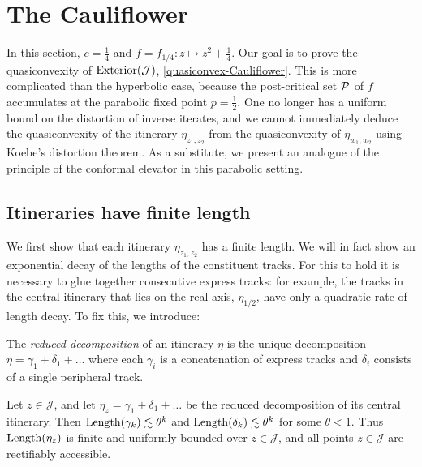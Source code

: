  

\section{The Cauliflower}
In this section, $c=\frac 14$ and $f=f_{1/4}: z\mapsto z^2+ \frac 14$.
Our goal is to prove the quasiconvexity of $\operatorname{Exterior}(\mathcal{J})$, \cref{quasiconvex-Cauliflower}. 
This is more complicated than the hyperbolic case, 
because the post-critical set $\operatorname{\mathcal P}$ of $f$ accumulates at the parabolic fixed point $p=\frac 12$. 
One no longer has a uniform bound on the distortion of inverse iterates, 
and we cannot immediately deduce the quasiconvexity of the itinerary $\eta_{z_1,z_2}$ from the quasiconvexity of $\eta_{w_1,w_2}$ using Koebe's distortion theorem. 
As a substitute, we present an analogue of the principle of the conformal elevator in this parabolic setting.

\subsection{Itineraries have finite length}
\label{sec:finite-length}

We first show that each itinerary $\eta_{z_1,z_2}$ has a finite length. 
We will in fact show an exponential decay of the lengths of the constituent tracks. 
For this to hold it is necessary to glue together consecutive express tracks: 
for example, the tracks in the central itinerary that lies on the real axis, $\eta_{1/2}$, 
have only a quadratic rate of length decay. To fix this, we introduce:

\begin{definition}
	The \emph{reduced decomposition} of an itinerary $\eta$ is the unique decomposition $\eta=\gamma_1 + \delta_1 + \dots$ where each $\gamma_i$ is a concatenation of express tracks and $\delta_i$ consists of a single peripheral track.
\end{definition}

\begin{proposition} \label{prop:finite-length}
	Let $z \in \mathcal J$, and let $\eta_z= \gamma_1 + \delta_1 + \dots  $ be the reduced decomposition of its central itinerary. Then $\operatorname{Length}(\gamma_k)\lesssim \theta^k$ and $\operatorname{Length}(\delta_k)\lesssim \theta^k$ for some $\theta < 1$. Thus $\operatorname{Length}(\eta_z)$ is finite and uniformly bounded over $z \in \mathcal J$, and all points $z\mathcal \in \mathcal J$ are rectifiably accessible.
\end{proposition}

